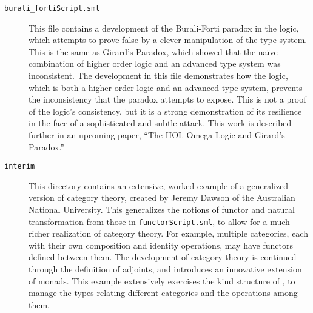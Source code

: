 \begin{description}
\item [\tt burali\_fortiScript.sml]

  This file contains a development of the Burali-Forti paradox in the
  \HOLW{} logic, which attempts to prove false by a clever manipulation
  of the type system. This is the same as Girard's Paradox, which showed 
  that the na\"{i}ve combination of higher order logic and an advanced type 
  system was inconsistent. The development in this file demonstrates how 
  the \HOLW{} logic, which is both a higher order logic and an advanced 
  type system, prevents the inconsistency that the paradox attempts 
  to expose.  This is not a proof of the logic's consistency, but it is 
  a strong demonstration of its resilience in the face of a sophisticated 
  and subtle attack. This work is described further in an upcoming paper, 
  ``The HOL-Omega Logic and Girard's Paradox.''

\item[\tt interim]

This directory contains an extensive, worked example of a generalized
version of category theory, created by Jeremy Dawson of the Australian National
University. This generalizes the notions of functor and natural transformation
from those in \texttt{functorScript.sml}, to allow for a much richer realization
of category theory. For example, multiple categories, each with their own composition
and identity operations, may have functors defined between them.
The development of category theory is continued through the definition of adjoints,
and introduces an innovative extension of monads.
This example extensively exercises the kind structure of \HOLW, to manage
the types relating different categories and the operations among them.

\end{description}


